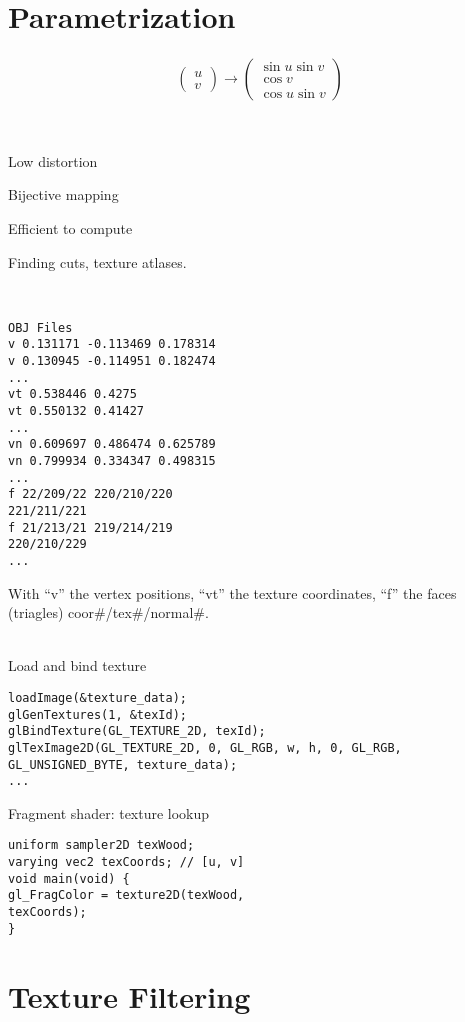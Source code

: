 \begin{compactdesc}
\section{Parametrization}
	\item[\lp{sphere}] 
		\begin{gather*}
			\!\left(\!\begin{smallmatrix}
				u\\
				v
			\end{smallmatrix}\!\right)\!
			\to
			\!\left(\!\begin{smallmatrix}
				\sin u\sin v\\
				\cos v\\
				\cos u \sin v
			\end{smallmatrix}\!\right)\!
		\end{gather*}
	\item[\lp{Desirable properties}]\hfill\\
		\begin{enumerate*}[label=\protect\circled{\arabic*},itemjoin=]
			\item Low distortion\\
			\item Bijective mapping\\
			\item Efficient to compute
		\end{enumerate*}
	\item[\lp{Issues}] Finding cuts, texture atlases.
	\item[\lp{OBJ files}]\hfill\\
		\begin{lstlisting}
OBJ Files
v 0.131171 -0.113469 0.178314
v 0.130945 -0.114951 0.182474
...
vt 0.538446 0.4275
vt 0.550132 0.41427
...
vn 0.609697 0.486474 0.625789
vn 0.799934 0.334347 0.498315
...
f 22/209/22 220/210/220
221/211/221
f 21/213/21 219/214/219
220/210/229
...
		\end{lstlisting}
		With ``v'' the vertex positions, ``vt'' the texture coordinates, ``f'' the faces (triagles) coor\#/tex\#/normal\#.
	\item[\lp{OpenGL}]\hfill\\
		Load and bind texture
		\begin{lstlisting}
loadImage(&texture_data);
glGenTextures(1, &texId);
glBindTexture(GL_TEXTURE_2D, texId);
glTexImage2D(GL_TEXTURE_2D, 0, GL_RGB, w, h, 0, GL_RGB, GL_UNSIGNED_BYTE, texture_data);
...
		\end{lstlisting}
		Fragment shader: texture lookup
		\begin{lstlisting}
uniform sampler2D texWood;
varying vec2 texCoords; // [u, v]
void main(void) {
gl_FragColor = texture2D(texWood,
texCoords);
}	
		\end{lstlisting}
		\section{Texture Filtering}
\end{compactdesc}
